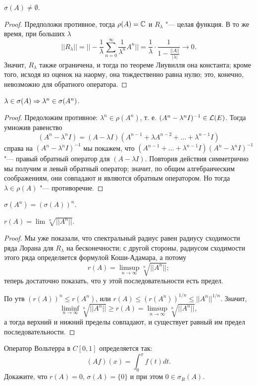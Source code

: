 \documentclass[main]{subfiles}
\begin{document}
\begin{proposition} %
  \( \sigma(A) \ne \emptyset \).
\end{proposition}
\begin{proof}
  Предположи противное, тогда \( \rho(A) = \mathbb{C} \)
  и \( R_\lambda \) "--- целая функция.
  В то же время, при больших \( \lambda \)
  \[
    ||R_\lambda|| =
    ||-\frac{1}{\lambda} \sum_{n=0}^\infty \frac{1}{\lambda^n} A^n|| =
    \frac{1}{\lambda} \cdot \frac{1}{1 - \frac{||A||}{|\lambda|}} \to 0.
  \]
  Значит, \( R_\lambda \) также ограничена, и тогда по теореме Лиувилля
  она константа; кроме того, исходя из оценок на наорму,
  она тождественно равна нулю; это, конечно, невозможно для обратного оператора.
\end{proof}

\begin{proposition} %
  $\lambda \in \sigma(A) \Rightarrow \lambda^n \in \sigma(A^n)$.
\end{proposition}

\begin{proof}
  Предоложим противное: $\lambda^n \in \rho(A^n)$, т. е.
  $(A^n - \lambda^n I)^{-1} \in \Linears{E}$.
  Тогда умножив равенство
  \[
    (A^n - \lambda^n I) = (A - \lambda I)
    (A^{n -1} + \lambda A^{n-2} + \dots + \lambda^{n-1} I)
  \]
  справа на \( (A^n - \lambda^n I)^{-1} \) мы покажем,
  что \( (A^{n -1} + \dots + \lambda^{n-1} I)(A^n - \lambda^n I)^{-1} \)
  "--- правый обратный оператор для \( (A - \lambda I) \).
  Повторив действия симметрично мы получим и левый обратный оператор;
  значит, по общим алгебраическим соображениям, они совпадают и
  являются обратным оператором.
  Но тогда \( \lambda \in \rho(A) \) "--- противоречие.
\end{proof}

\begin{exercise}
  \( \sigma(A^n) = (\sigma(A))^n \).
\end{exercise}

\begin{proposition}
  $ r(A) = \lim \sqrt[n]{||A^n||} $.
\end{proposition}
\begin{proof}
  Мы уже показали, что спектральный радиус равен радиусу сходимости
  ряда Лорана для \( R_\lambda \) на бесконечности;
  с другой стороны, радиусом сходимости этого ряда определяется
  формулой Коши-Адамара, а потому
  \[
    r(A) = \limsup_{n \to \infty} \sqrt[n]{||A^n||};
  \]
  теперь достаточно показать, что у этой последовательности есть предел.

  По утв $(r(A))^n \le r(A^n)$, или
  $r(A) \le \left(r(A^n) \right)^{1/n} \le ||A^n||^{1/n}$.
  Значит,
  \[ \liminf_{n \to \infty} \sqrt[n]{||A^n||} \ge r(A) = \limsup_{n \to \infty} \sqrt[n]{||A^n||}, \]
  а тогда верхний и нижний пределы совпадают, и существует равный им предел последовательности.
\end{proof}

\begin{exercise}
  Оператор Вольтерра в \( C[0, 1] \) определяется так:
  \[ (Af)(x) = \int_{0}^x f(t) dt. \]
  Докажите, что \( r(A) = 0 \), \( \sigma(A) = \{ 0 \} \)
  и при этом \( 0 \in \sigma_R(A) \).
\end{exercise}
 
\end{document}
